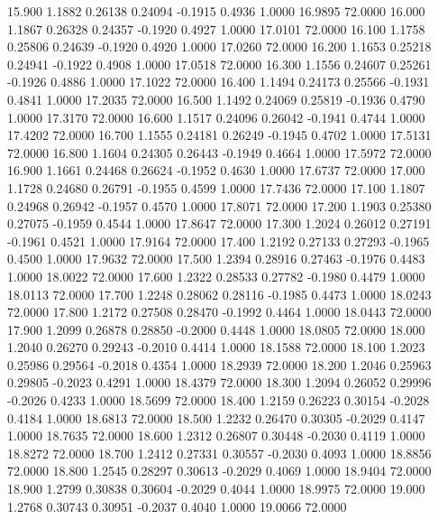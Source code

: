   15.900   1.1882   0.26138   0.24094  -0.1915   0.4936   1.0000  16.9895  72.0000
  16.000   1.1867   0.26328   0.24357  -0.1920   0.4927   1.0000  17.0101  72.0000
  16.100   1.1758   0.25806   0.24639  -0.1920   0.4920   1.0000  17.0260  72.0000
  16.200   1.1653   0.25218   0.24941  -0.1922   0.4908   1.0000  17.0518  72.0000
  16.300   1.1556   0.24607   0.25261  -0.1926   0.4886   1.0000  17.1022  72.0000
  16.400   1.1494   0.24173   0.25566  -0.1931   0.4841   1.0000  17.2035  72.0000
  16.500   1.1492   0.24069   0.25819  -0.1936   0.4790   1.0000  17.3170  72.0000
  16.600   1.1517   0.24096   0.26042  -0.1941   0.4744   1.0000  17.4202  72.0000
  16.700   1.1555   0.24181   0.26249  -0.1945   0.4702   1.0000  17.5131  72.0000
  16.800   1.1604   0.24305   0.26443  -0.1949   0.4664   1.0000  17.5972  72.0000
  16.900   1.1661   0.24468   0.26624  -0.1952   0.4630   1.0000  17.6737  72.0000
  17.000   1.1728   0.24680   0.26791  -0.1955   0.4599   1.0000  17.7436  72.0000
  17.100   1.1807   0.24968   0.26942  -0.1957   0.4570   1.0000  17.8071  72.0000
  17.200   1.1903   0.25380   0.27075  -0.1959   0.4544   1.0000  17.8647  72.0000
  17.300   1.2024   0.26012   0.27191  -0.1961   0.4521   1.0000  17.9164  72.0000
  17.400   1.2192   0.27133   0.27293  -0.1965   0.4500   1.0000  17.9632  72.0000
  17.500   1.2394   0.28916   0.27463  -0.1976   0.4483   1.0000  18.0022  72.0000
  17.600   1.2322   0.28533   0.27782  -0.1980   0.4479   1.0000  18.0113  72.0000
  17.700   1.2248   0.28062   0.28116  -0.1985   0.4473   1.0000  18.0243  72.0000
  17.800   1.2172   0.27508   0.28470  -0.1992   0.4464   1.0000  18.0443  72.0000
  17.900   1.2099   0.26878   0.28850  -0.2000   0.4448   1.0000  18.0805  72.0000
  18.000   1.2040   0.26270   0.29243  -0.2010   0.4414   1.0000  18.1588  72.0000
  18.100   1.2023   0.25986   0.29564  -0.2018   0.4354   1.0000  18.2939  72.0000
  18.200   1.2046   0.25963   0.29805  -0.2023   0.4291   1.0000  18.4379  72.0000
  18.300   1.2094   0.26052   0.29996  -0.2026   0.4233   1.0000  18.5699  72.0000
  18.400   1.2159   0.26223   0.30154  -0.2028   0.4184   1.0000  18.6813  72.0000
  18.500   1.2232   0.26470   0.30305  -0.2029   0.4147   1.0000  18.7635  72.0000
  18.600   1.2312   0.26807   0.30448  -0.2030   0.4119   1.0000  18.8272  72.0000
  18.700   1.2412   0.27331   0.30557  -0.2030   0.4093   1.0000  18.8856  72.0000
  18.800   1.2545   0.28297   0.30613  -0.2029   0.4069   1.0000  18.9404  72.0000
  18.900   1.2799   0.30838   0.30604  -0.2029   0.4044   1.0000  18.9975  72.0000
  19.000   1.2768   0.30743   0.30951  -0.2037   0.4040   1.0000  19.0066  72.0000
